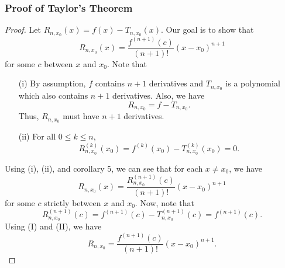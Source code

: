 \subsubsection{Proof of Taylor's Theorem}
\begin{proof}
Let \( {R}_{n,{x}_{0}}(x) = f(x) - {T}_{n,{x}_{0}}(x)  \). Our goal is to show that 
\[  {R}_{n,{x}_{0}}(x) = \frac{ f^{(n+1)}(c) }{ (n+1)! } (x - {x}_{0})^{n+1} \]
for some \( c  \) between \( x  \) and \( {x}_{0} \). Note that 
\begin{enumerate}
    \item[(i)] By assumption, \( f \) contains \( n + 1  \) derivatives and \( {T}_{n,{x}_{0}}  \) is a polynomial which also contains \( n + 1  \) derivatives. Also, we have 
        \[  {R}_{n,{x}_{0}} = f - {T}_{n,{x}_{0}}. \]
        Thus, \( {R}_{n,{x}_{0}}  \) must have \( n + 1  \) derivatives.
    \item[(ii)] For all \( 0 \leq k \leq n  \),
        \[  {R}_{n, {x}_{0}}^{(k)}({x}_{0}) = f^{(k)}({x}_{0}) - {T}_{n,{x}_{0}}^{(k)}({x}_{0}) = 0. \]
\end{enumerate}
Using (i), (ii), and corollary 5, we can see that for each \( x \neq {x}_{0} \), we have 
\[  R_{n,{x}_{0}}(x) = \frac{ {R}_{n,{x}_{0}}^{(n+1)}(c) }{ (n+1)! }  (x - {x}_{0})^{n+1} \tag{I} \]
for some \( c  \) strictly between \( x  \) and \( {x}_{0} \). Now, note that 
\[  {R}_{n,{x}_{0}}^{(n+1)}(c) = f^{(n+1)}(c) - {T}_{n,{x}_{0}}^{(n+1)}(c) = f^{(n+1)}(c). \tag{II}  \]
Using (I) and (II), we have 
\[  {R}_{n,{x}_{0}} = \frac{ f^{(n+1)}(c) }{ (n+1)! } (x - {x}_{0})^{n+1}.\]
\end{proof}

